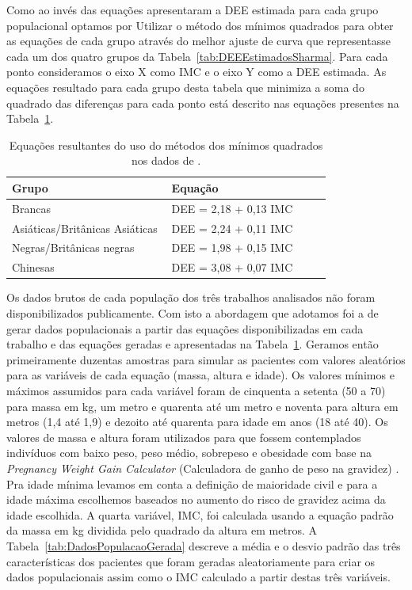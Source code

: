 Como \textcite{Sharma2011} ao invés das equações apresentaram a \acrshort{DEE} estimada para cada grupo populacional optamos por Utilizar o método dos mínimos quadrados para obter as equações de cada grupo através do melhor ajuste de curva que representasse cada um dos quatro grupos da Tabela~\ref{tab:DEEEstimadosSharma}. Para cada ponto consideramos o eixo X como \acrshort{IMC} e o eixo Y como a \acrshort{DEE} estimada. As equações resultado para cada grupo desta tabela que minimiza a soma do quadrado das diferenças para cada ponto está descrito nas equações presentes na Tabela~\ref{tab:DEEEquacoesMinimosQuadrados}.

\begin{table}[!ht]
\begin{center}
\caption{Equações resultantes do uso do métodos dos mínimos quadrados nos dados de \textcite{Sharma2011}.}
\label{tab:DEEEquacoesMinimosQuadrados}
\begin{tabular}{|p{0.4\linewidth}|p{0.4\linewidth}|}
\hline
\textbf{Grupo} & \textbf{Equação}\\
\hline\hline
Brancas & DEE = 2,18 + 0,13 IMC\\
Asiáticas/Britânicas Asiáticas & DEE = 2,24 + 0,11 IMC\\
Negras/Britânicas negras & DEE = 1,98 + 0,15 IMC\\
Chinesas & DEE = 3,08 + 0,07 IMC\\
\hline
\end{tabular}
\end{center}
\end{table}

Os dados brutos de cada população dos três trabalhos analisados não foram disponibilizados publicamente. Com isto a abordagem que adotamos foi a de gerar dados populacionais a partir das equações disponibilizadas em cada trabalho e das equações geradas e apresentadas na Tabela~\ref{tab:DEEEquacoesMinimosQuadrados}. Geramos então primeiramente duzentas amostras para simular as pacientes com valores aleatórios para as variáveis de cada equação (massa, altura e idade). Os valores mínimos e máximos assumidos para cada variável foram de cinquenta a setenta (50 a 70) para massa em kg, um metro e quarenta até um metro e noventa para altura em metros (1,4 até 1,9) e dezoito até quarenta para idade em anos (18 até 40). Os valores de massa e altura foram utilizados para que fossem contemplados indivíduos com baixo peso, peso médio, sobrepeso e obesidade com base na \textit{Pregnancy Weight Gain Calculator} (Calculadora de ganho de peso na gravidez) \cite{MTILLC2019}. Pra idade mínima levamos em conta a definição de maioridade civil e para a idade máxima escolhemos baseados no aumento do risco de gravidez acima da idade escolhida. A quarta variável, \acrshort{IMC}, foi calculada usando a equação padrão da massa em kg dividida pelo quadrado da altura em metros. 
A Tabela~\ref{tab:DadosPopulacaoGerada} descreve a média e o desvio padrão das três características dos pacientes que foram geradas aleatoriamente para criar os dados populacionais assim como o \acrshort{IMC} calculado a partir destas três variáveis. 

